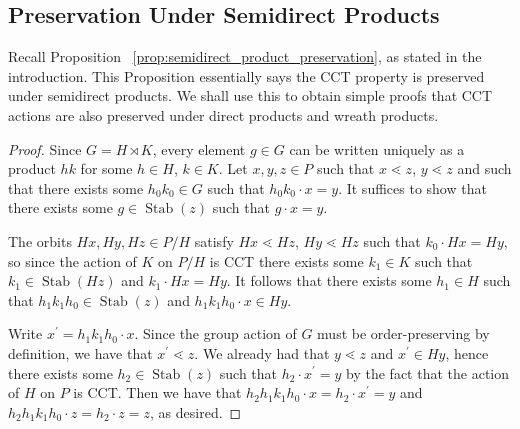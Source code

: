 \documentclass[10 pt]{amsart}
\theoremstyle{plain}
\theoremstyle{definition}
\theoremstyle{remark}
\numberwithin{equation}{section}
\newcommand\ssec{\subsection}
\def\Stab{\operatorname{Stab}}
\begin{document}
\ssec{Preservation Under Semidirect Products}
\label{ssec:semidirect_product_preservation}
Recall Proposition ~\ref{prop:semidirect_product_preservation}, as stated in the introduction. This Proposition essentially says the CCT property is preserved under semidirect products. We shall use this to obtain simple proofs that CCT actions are also preserved under direct products and wreath products.

\semidirect*

\begin{proof}
Since $G = H\rtimes K$, every element $g\in G$ can be written uniquely as a product $hk$ for some $h\in H$, $k\in K$.  Let $x,y,z\in P$ such that $x\lessdot z$, $y\lessdot z$ and such that there exists some $h_0k_0\in G$ such that $h_0k_0\cdot x = y$.  It suffices to show that there exists some $g\in \Stab(z)$ such that $g\cdot x = y$.

The orbits $Hx, Hy, Hz\in P/H$ satisfy $Hx\lessdot Hz$, $Hy\lessdot Hz$ such that $k_0\cdot Hx = Hy$, so since the action of $K$ on $P/H$ is CCT there exists some $k_1\in K$ such that $k_1\in \Stab(Hz)$ and $k_1\cdot Hx = Hy$.  It follows that there exists some $h_1\in H$ such that $h_1k_1h_0\in \Stab(z)$ and $h_1k_1h_0\cdot x\in Hy$.

Write $x^\prime = h_1k_1h_0\cdot x$.  Since the group action of $G$ must be order-preserving by definition, we have that $x^\prime \lessdot z$.  We already had that $y\lessdot z$ and $x^\prime\in Hy$, hence there exists some $h_2\in \Stab(z)$ such that $h_2\cdot x^\prime = y$ by the fact that the action of $H$ on $P$ is CCT.  Then we have that $h_2h_1k_1h_0\cdot x = h_2\cdot x^\prime = y$ and $h_2h_1k_1h_0\cdot z = h_2\cdot z = z$, as desired.
\end{proof}
\end{document}
